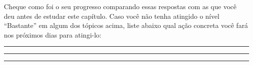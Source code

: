 \documentclass[main_estudante.tex]{subfiles}
\begin{document}
Cheque como foi o seu progresso comparando essas respostas com as que você deu antes de estudar este capítulo. Caso você não tenha atingido o nível ``Bastante''  em algum dos tópicos acima, liste abaixo qual ação concreta você fará nos próximos dias para atingi-lo:

\vspace{0.3cm}

\noindent\rule{\linewidth}{0.4pt}

\noindent\rule{\linewidth}{0.4pt}

\noindent\rule{\linewidth}{0.4pt}

\paraAmbos
\end{document}
